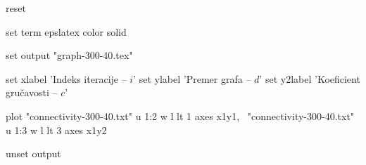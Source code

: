reset

set term epslatex color solid

set output "graph-300-40.tex"

set xlabel 'Indeks iteracije -- $i$'
set ylabel 'Premer grafa -- $d$'
set y2label 'Koeficient gru\v{c}avosti -- $c$'

plot "connectivity-300-40.txt" u 1:2 w l lt 1 axes x1y1, \
	"connectivity-300-40.txt" u 1:3 w l lt 3 axes x1y2

unset output

